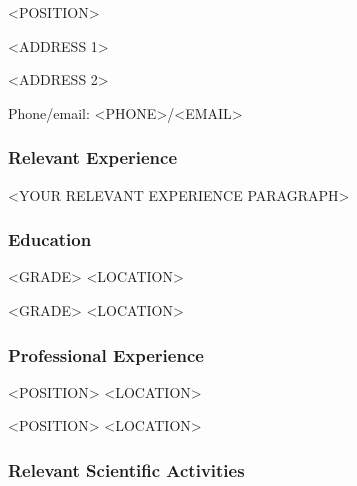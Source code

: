\hspace{33pt}<POSITION>

\noindent\hspace{33pt}<ADDRESS 1>

\noindent\hspace{33pt}<ADDRESS 2>

\noindent\hspace{33pt}Phone/email: <PHONE>/<EMAIL>



\subsubsection*{Relevant Experience}
\vspace{-.5em}

<YOUR RELEVANT EXPERIENCE PARAGRAPH>

\vspace{-.5em}
\subsubsection*{Education}
\vspace{-.5em}

\TabPositions{10em,26em}

 \tab <GRADE> \tab <LOCATION>

 \tab <GRADE> \tab <LOCATION>



\vspace{-.5em}
\subsubsection*{Professional Experience}
\vspace{-.5em}

\TabPositions{10em,26em}

 \tab <POSITION> \tab <LOCATION>

 \tab <POSITION> \tab <LOCATION>



\vspace{-.5em}
\subsubsection*{Relevant Scientific Activities}
\vspace{-.5em}


